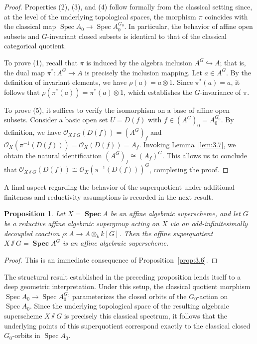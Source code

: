 \documentclass[11pt,a4paper,reqno,noamsfonts]{amsart}
\numberwithin{equation}{section}
\newtheorem{proposition}[theorem]{Proposition}
\theoremstyle{definition}
\theoremstyle{remark}
\newcommand{\Ocal}{\ensuremath{\mathscr{O}}}
\DeclareMathOperator{\Spec}{Spec}
\DeclareMathOperator{\sSpec}{\mathbf{Spec}}
\begin{document}
\begin{proof}
Properties (2), (3), and (4) follow formally from the classical setting since, at the level of the underlying topological spaces, the morphism $\pi$ coincides with the classical map $\Spec A_0 \to \Spec A_0^{G_0}$. In particular, the behavior of affine open subsets and $G$-invariant closed subsets is identical to that of the classical categorical quotient.

To prove (1), recall that $\pi$ is induced by the algebra inclusion $A^G \hookrightarrow A$; that is, the dual map $\pi^* \colon A^G \to A$ is precisely the inclusion mapping. Let $a \in A^G$. By the definition of invariant elements, we have $\rho(a) = a \otimes 1$. Since $\pi^*(a) = a$, it follows that $\rho(\pi^*(a)) = \pi^*(a) \otimes 1$, which establishes the $G$-invariance of $\pi$.

To prove (5), it suffices to verify the isomorphism on a base of affine open subsets. Consider a basic open set $U = D(f)$ with $f \in (A^G)_0 = A_0^{G_0}$. By definition, we have $\Ocal_{X {\sslash} G}(D(f)) = (A^G)_f$ and $\Ocal_X(\pi^{-1}(D(f))) = \Ocal_X(D(f)) = A_f$. Invoking Lemma~\ref{lem:3.7}, we obtain the natural identification $(A^G)_f \cong (A_f)^G$. This allows us to conclude that $\Ocal_{X {\sslash} G}(D(f)) \cong \Ocal_X(\pi^{-1}(D(f)))^G$, completing the proof.
\end{proof}

A final aspect regarding the behavior of the superquotient under additional finiteness and reductivity assumptions is recorded in the next result.

\begin{proposition}\label{prop:3.9}
Let $X = \sSpec A$ be an affine algebraic superscheme, and let $G$ be a reductive affine algebraic supergroup acting on $X$ via an odd-infinitesimally decoupled coaction $\rho \colon A \to A \otimes_k k[G]$. Then the affine superquotient $X {\sslash} G = \sSpec A^G$ is an affine algebraic superscheme.
\end{proposition}

\begin{proof}
This is an immediate consequence of Proposition~\ref{prop:3.6}.
\end{proof}

The structural result established in the preceding proposition lends itself to a deep geometric interpretation. Under this setup, the classical quotient morphism $\Spec A_0 \to \Spec A_0^{G_0}$ parameterizes the closed orbits of the $G_{0}$-action on $\Spec  A_0$. Since the underlying topological space of the resulting algebraic superscheme $X {\sslash} G$ is precisely this classical spectrum, it follows that the underlying points of this superquotient correspond exactly to the classical closed $G_{0}$-orbits in $\Spec  A_0$.
\end{document}
